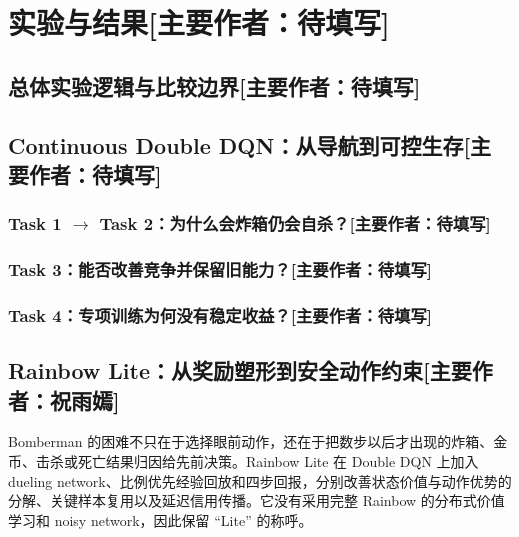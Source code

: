 \documentclass[UTF8,11pt,a4paper,fontset=none]{ctexart}
\newcommand{\primaryauthor}[1]{\texorpdfstring{\enspace\normalfont\small[主要作者：#1]}{ [主要作者：#1]}}
\newcommand{\authorsection}[2]{\section{#1\primaryauthor{#2}}}
\newcommand{\authorsubsection}[2]{\subsection{#1\primaryauthor{#2}}}
\newcommand{\authorsubsubsection}[2]{\subsubsection{#1\primaryauthor{#2}}}
\newcommand{\pendingauthor}{待填写}
\newif\ifdraftguidance
\newcommand{\writingnote}[1]{%
  \ifdraftguidance
    \par\noindent\begingroup\color{promptblue}\small
    \fbox{\begin{minipage}{0.94\linewidth}\textbf{写作提示：}#1\end{minipage}}%
    \par\endgroup
  \fi
}
\newcommand{\todoitem}[1]{%
  \ifdraftguidance\textcolor{promptblue}{\textbf{[待补：#1]}}\fi
}
\begin{document}
\authorsection{实验与结果}{\pendingauthor}
\label{sec:results}
\writingnote{本章是报告重点。每个实验段落必须回答：问题、证据、诊断、解决方案、验证、结果、有限答案和下一决策。}

\setcounter{subsection}{-1}
\authorsubsection{总体实验逻辑与比较边界}{\pendingauthor}
\writingnote{Task 1--4 依次隔离导航、炸箱逃生、弱对手竞争和强对手压力，后续任务必须回测早期能力；三条路线共享 Feature、Reward、Survival Mask 与冻结评估，但针对表示、信用和安全提出不同假设；课程 agents 作为兼容性、课程或压力测试对象，缺少同协议冻结结果时不建立 baseline 数值排名；verified\_raw 支持正式差值，verified\_summary 描述历史结果，not\_comparable 仅作诊断，unrun 明确为未运行。}
\todoitem{正文}

\authorsubsection{Continuous Double DQN：从导航到可控生存}{\pendingauthor}

\authorsubsubsection{Task 1 $\rightarrow$ Task 2：为什么会炸箱仍会自杀？}{\pendingauthor}
\writingnote{按“问题—证据—诊断—解决—验证—结论—决策”写作。早期候选为 5.45 coins、76.65 crates、30\% suicide；解决方案是将 survival mask 用于行为、推理和 bootstrap；主验证为 7.25 coins、100.26 crates、0\% suicide、100\% Task 1 retention；结论限定为安全准入解决晋级阻塞，但不等于学会全部长期规划。}
\todoitem{正文}

\authorsubsubsection{Task 3：能否改善竞争并保留旧能力？}{\pendingauthor}
\writingnote{按统一七步叙事写作。报告三 seed confirmation 与 seed22/c150 main validation；三条独立训练链得分增量为 +1.92、+1.23、+2.56，均值 +1.90，样本标准差 0.67；每条链的 100 个世界是环境重复，不写成 300 次独立训练；得分 5.91 $\rightarrow$ 7.14，差值 1.23，CI [0.27, 2.14]；第一名率 41\% $\rightarrow$ 53\%；击杀 0.45 $\rightarrow$ 0.44，不称击杀改善。}
\todoitem{正文与 Table 2：Task 3 父子配对}

\authorsubsubsection{Task 4：专项训练为何没有稳定收益？}{\pendingauthor}
\writingnote{按统一七步叙事写作。说明 Shared-parent admission failure；将 E1/E2/E3、Frozen C/S 和 score campaign 分开呈现；结论只限定于已运行协议。}
\todoitem{正文}

\authorsubsection{Rainbow Lite：从奖励塑形到安全动作约束}{祝雨嫣}

Bomberman 的困难不只在于选择眼前动作，还在于把数步以后才出现的炸箱、金币、击杀或死亡结果归因给先前决策。Rainbow Lite 在 Double DQN 上加入 dueling network、比例优先经验回放和四步回报，分别改善状态价值与动作优势的分解、关键样本复用以及延迟信用传播。它没有采用完整 Rainbow 的分布式价值学习和 noisy network，因此保留 ``Lite'' 的称呼。
\end{document}
